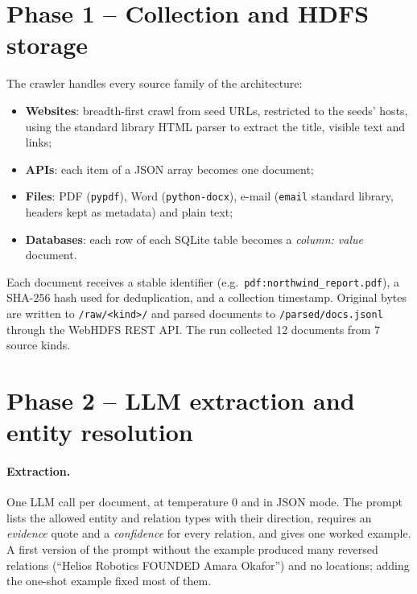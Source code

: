\documentclass[11pt,a4paper]{report}
\begin{document}
\section{Phase 1 -- Collection and HDFS storage}
The crawler handles every source family of the architecture:
\begin{itemize}
  \item \textbf{Websites}: breadth-first crawl from seed URLs, restricted to the seeds' hosts, using the standard
        library HTML parser to extract the title, visible text and links;
  \item \textbf{APIs}: each item of a JSON array becomes one document;
  \item \textbf{Files}: PDF (\texttt{pypdf}), Word (\texttt{python-docx}), e-mail (\texttt{email} standard library,
        headers kept as metadata) and plain text;
  \item \textbf{Databases}: each row of each SQLite table becomes a \emph{column: value} document.
\end{itemize}
Each document receives a stable identifier (e.g.\ \texttt{pdf:northwind\_report.pdf}), a SHA-256 hash used for
deduplication, and a collection timestamp. Original bytes are written to \texttt{/raw/<kind>/} and parsed documents to
\texttt{/parsed/docs.jsonl} through the WebHDFS REST API. The run collected 12 documents from 7 source kinds.

\section{Phase 2 -- LLM extraction and entity resolution}
\paragraph{Extraction.} One LLM call per document, at temperature 0 and in JSON mode. The prompt lists the
allowed entity and relation types with their direction, requires an \emph{evidence} quote and a \emph{confidence}
for every relation, and gives one worked example. A first version of the prompt without the example produced many
reversed relations (``Helios Robotics FOUNDED Amara Okafor'') and no locations; adding the one-shot example fixed
most of them.
\end{document}
